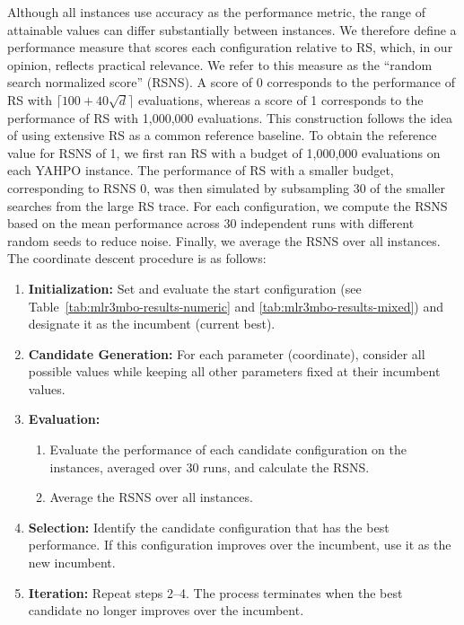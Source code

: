 \documentclass[12pt,letterpaper]{article}
\begin{document}
Although all instances use accuracy as the performance metric, the range of attainable values can differ substantially between instances.
We therefore define a performance measure that scores each configuration relative to RS, which, in our opinion, reflects practical relevance. 
We refer to this measure as the ``random search normalized score'' (RSNS).
A score of 0 corresponds to the performance of RS with $\lceil 100 + 40 \sqrt{d} \rceil$ evaluations, whereas a score of 1 corresponds to the performance of RS with 1{,}000{,}000 evaluations.
This construction follows the idea of using extensive RS as a common reference baseline\cite{turner2021}.
To obtain the reference value for RSNS of 1, we first ran RS with a budget of 1{,}000{,}000 evaluations on each YAHPO instance.
The performance of RS with a smaller budget, corresponding to RSNS 0, was then simulated by subsampling 30 of the smaller searches from the large RS trace. 
For each configuration, we compute the RSNS based on the mean performance across 30 independent runs with different random seeds to reduce noise.
Finally, we average the RSNS over all instances.
The coordinate descent procedure is as follows:

\begin{enumerate}
    \item \textbf{Initialization:} Set and evaluate the start configuration (see Table~\ref{tab:mlr3mbo-results-numeric} and \ref{tab:mlr3mbo-results-mixed}) and designate it as the incumbent (current best).
    \item \textbf{Candidate Generation:} For each parameter (coordinate), consider all possible values while keeping all other parameters fixed at their incumbent values.
    \item \textbf{Evaluation:}
    \begin{enumerate}
        \item Evaluate the performance of each candidate configuration on the instances, averaged over 30 runs, and calculate the RSNS.
        \item Average the RSNS over all instances.
    \end{enumerate}
    \item \textbf{Selection:} Identify the candidate configuration that has the best performance. If this configuration improves over the incumbent, use it as the new incumbent.
    \item \textbf{Iteration:} Repeat steps 2--4. The process terminates when the best candidate no longer improves over the incumbent.
\end{enumerate}
\end{document}

